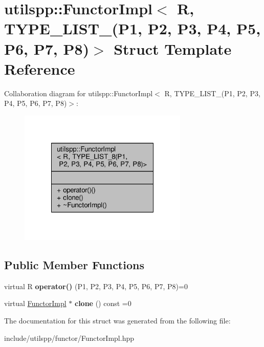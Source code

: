 \hypertarget{structutilspp_1_1FunctorImpl_3_01R_00_01TYPE__LIST__8_07P1_00_01P2_00_01P3_00_01P4_00_01P5_00_01P6_00_01P7_00_01P8_08_4}{\section{utilspp\-:\-:Functor\-Impl$<$ R, T\-Y\-P\-E\-\_\-\-L\-I\-S\-T\-\_(P1, P2, P3, P4, P5, P6, P7, P8)$>$ Struct Template Reference}
\label{structutilspp_1_1FunctorImpl_3_01R_00_01TYPE__LIST__8_07P1_00_01P2_00_01P3_00_01P4_00_01P5_00_01P6_00_01P7_00_01P8_08_4}
}


Collaboration diagram for utilspp\-:\-:Functor\-Impl$<$ R, T\-Y\-P\-E\-\_\-\-L\-I\-S\-T\-\_(P1, P2, P3, P4, P5, P6, P7, P8)$>$\-:
\nopagebreak
\begin{figure}[H]
\begin{center}
\leavevmode
\includegraphics[width=228pt]{structutilspp_1_1FunctorImpl_3_01R_00_01TYPE__LIST__8_07P1_00_01P2_00_01P3_00_01P4_00_01P5_00_01eaff29217b79fd24c63be91c19f9cd67}
\end{center}
\end{figure}
\subsection*{Public Member Functions}
\begin{DoxyCompactItemize}
\item 
\hypertarget{structutilspp_1_1FunctorImpl_3_01R_00_01TYPE__LIST__8_07P1_00_01P2_00_01P3_00_01P4_00_01P5_00_01P6_00_01P7_00_01P8_08_4_a5dd556b1e3ce7a9f6cf5dd71e83d5e26}{virtual R {\bfseries operator()} (P1, P2, P3, P4, P5, P6, P7, P8)=0}\label{structutilspp_1_1FunctorImpl_3_01R_00_01TYPE__LIST__8_07P1_00_01P2_00_01P3_00_01P4_00_01P5_00_01P6_00_01P7_00_01P8_08_4_a5dd556b1e3ce7a9f6cf5dd71e83d5e26}

\item 
\hypertarget{structutilspp_1_1FunctorImpl_3_01R_00_01TYPE__LIST__8_07P1_00_01P2_00_01P3_00_01P4_00_01P5_00_01P6_00_01P7_00_01P8_08_4_a4f1cf63252b12084d399f7c3375cdf5b}{virtual \hyperlink{structutilspp_1_1FunctorImpl}{Functor\-Impl} $\ast$ {\bfseries clone} () const =0}\label{structutilspp_1_1FunctorImpl_3_01R_00_01TYPE__LIST__8_07P1_00_01P2_00_01P3_00_01P4_00_01P5_00_01P6_00_01P7_00_01P8_08_4_a4f1cf63252b12084d399f7c3375cdf5b}

\end{DoxyCompactItemize}


The documentation for this struct was generated from the following file\-:\begin{DoxyCompactItemize}
\item 
include/utilspp/functor/Functor\-Impl.\-hpp\end{DoxyCompactItemize}
